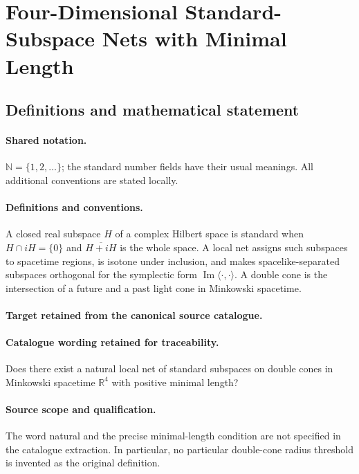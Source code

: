 \documentclass[11pt]{article}
\begin{document}
\section{Four-Dimensional Standard-Subspace Nets with Minimal Length}\label{statement}

\subsection{Definitions and mathematical statement}

\paragraph{Shared notation.}$\mathbb N=\{1,2,\ldots\}$; the standard number fields have their usual meanings. All additional conventions are stated locally.


\paragraph{Definitions and conventions.}
A closed real subspace $H$ of a complex Hilbert space is standard when $H\cap iH=\{0\}$ and $\overline{H+iH}$ is the whole space. A local net assigns such subspaces to spacetime regions, is isotone under inclusion, and makes spacelike-separated subspaces orthogonal for the symplectic form $\operatorname{Im}\langle\cdot,\cdot\rangle$. A double cone is the intersection of a future and a past light cone in Minkowski spacetime.

\paragraph{Target retained from the canonical source catalogue.}
\paragraph{Catalogue wording retained for traceability.}
Does there exist a natural local net of standard subspaces on double cones in Minkowski spacetime $\mathbb R^4$ with positive minimal length?

\paragraph{Source scope and qualification.}
The word natural and the precise minimal-length condition are not specified in the catalogue extraction. In particular, no particular double-cone radius threshold is invented as the original definition.
\end{document}
